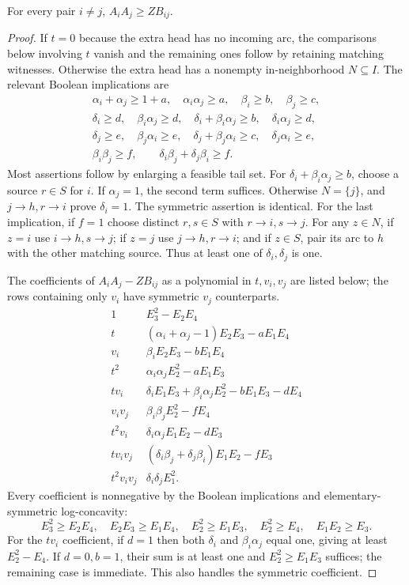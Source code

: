 \documentclass[11pt]{article}
\numberwithin{equation}{section}
\theoremstyle{definition}\newtheorem{definition}[theorem]{Definition}\newtheorem{remark}[theorem]{Remark}
\begin{document}
\begin{lemma}\label{pgr:s:fb:lem:pair}
For every pair $i\ne j$, $A_iA_j\ge ZB_{ij}$.
\end{lemma}
\begin{proof}
If $t=0$ because the extra head has no incoming arc, the comparisons below involving $t$ vanish and the remaining ones follow by retaining matching witnesses. Otherwise the extra head has a nonempty in-neighborhood $N\subseteq I$.
The relevant Boolean implications are
\begin{gather*}
 \alpha_i+\alpha_j\ge1+a,\quad \alpha_i\alpha_j\ge a,
 \quad \beta_i\ge b,\quad\beta_j\ge c,\\
 \delta_i\ge d,\quad\beta_i\alpha_j\ge d,
 \quad\delta_i+\beta_i\alpha_j\ge b,
 \quad\delta_i\alpha_j\ge d,\\
 \delta_j\ge e,\quad\beta_j\alpha_i\ge e,
 \quad\delta_j+\beta_j\alpha_i\ge c,
 \quad\delta_j\alpha_i\ge e,\\
 \beta_i\beta_j\ge f,\qquad
 \delta_i\beta_j+\delta_j\beta_i\ge f.
\end{gather*}
Most assertions follow by enlarging a feasible tail set. For $\delta_i+\beta_i\alpha_j\ge b$, choose a source $r\in S$ for $i$. If $\alpha_j=1$, the second term suffices. Otherwise $N=\{j\}$, and $j\to h,r\to i$ prove $\delta_i=1$. The symmetric assertion is identical. For the last implication, if $f=1$ choose distinct $r,s\in S$ with $r\to i,s\to j$. For any $z\in N$, if $z=i$ use $i\to h,s\to j$; if $z=j$ use $j\to h,r\to i$; and if $z\in S$, pair its arc to $h$ with the other matching source. Thus at least one of $\delta_i,\delta_j$ is one.

The coefficients of $A_iA_j-ZB_{ij}$ as a polynomial in $t,v_i,v_j$ are listed below; the rows containing only $v_i$ have symmetric $v_j$ counterparts.
\[
\begin{array}{c|l}
 1&E_3^2-E_2E_4\\
 t&(\alpha_i+\alpha_j-1)E_2E_3-aE_1E_4\\
 v_i&\beta_iE_2E_3-bE_1E_4\\
 t^2&\alpha_i\alpha_jE_2^2-aE_1E_3\\
 tv_i&\delta_iE_1E_3+\beta_i\alpha_jE_2^2-bE_1E_3-dE_4\\
 v_iv_j&\beta_i\beta_jE_2^2-fE_4\\
 t^2v_i&\delta_i\alpha_jE_1E_2-dE_3\\
 tv_iv_j&(\delta_i\beta_j+\delta_j\beta_i)E_1E_2-fE_3\\
 t^2v_iv_j&\delta_i\delta_jE_1^2.
\end{array}
\]
Every coefficient is nonnegative by the Boolean implications and elementary-symmetric log-concavity:
\[
 E_3^2\ge E_2E_4,\quad E_2E_3\ge E_1E_4,\quad
 E_2^2\ge E_1E_3,\quad E_2^2\ge E_4,\quad E_1E_2\ge E_3.
\]
For the $tv_i$ coefficient, if $d=1$ then both $\delta_i$ and $\beta_i\alpha_j$ equal one, giving at least $E_2^2-E_4$. If $d=0,b=1$, their sum is at least one and $E_2^2\ge E_1E_3$ suffices; the remaining case is immediate. This also handles the symmetric coefficient.
\end{proof}
\end{document}
